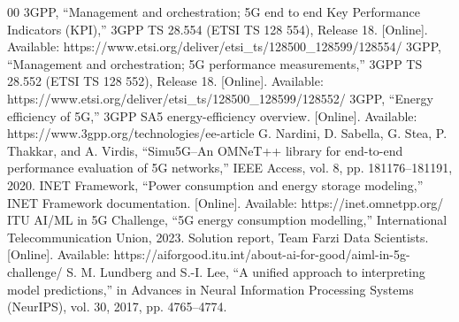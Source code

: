 \documentclass[conference]{IEEEtran}
\begin{document}
\begin{thebibliography}{00}
 3GPP, ``Management and orchestration; 5G end to end Key Performance Indicators (KPI),'' 3GPP TS 28.554 (ETSI TS 128 554), Release 18. [Online]. Available: https://www.etsi.org/deliver/etsi\_ts/128500\_128599/128554/
 3GPP, ``Management and orchestration; 5G performance measurements,'' 3GPP TS 28.552 (ETSI TS 128 552), Release 18. [Online]. Available: https://www.etsi.org/deliver/etsi\_ts/128500\_128599/128552/
 3GPP, ``Energy efficiency of 5G,'' 3GPP SA5 energy-efficiency overview. [Online]. Available: https://www.3gpp.org/technologies/ee-article
 G. Nardini, D. Sabella, G. Stea, P. Thakkar, and A. Virdis, ``Simu5G--An OMNeT++ library for end-to-end performance evaluation of 5G networks,'' IEEE Access, vol. 8, pp. 181176--181191, 2020.
 INET Framework, ``Power consumption and energy storage modeling,'' INET Framework documentation. [Online]. Available: https://inet.omnetpp.org/
 ITU AI/ML in 5G Challenge, ``5G energy consumption modelling,'' International Telecommunication Union, 2023. Solution report, Team Farzi Data Scientists. [Online]. Available: https://aiforgood.itu.int/about-ai-for-good/aiml-in-5g-challenge/
 S. M. Lundberg and S.-I. Lee, ``A unified approach to interpreting model predictions,'' in Advances in Neural Information Processing Systems (NeurIPS), vol. 30, 2017, pp. 4765--4774.
\end{thebibliography}
\end{document}
